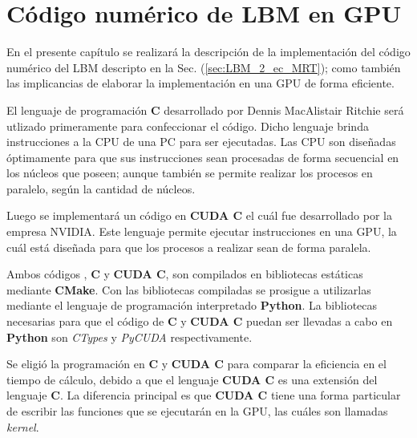 \chapter{Código numérico de LBM en GPU}
\graphicspath{{figs/cap3/}}
\label{cap3}




En el presente capítulo se realizará la descripción de la implementación del código numérico del LBM descripto en la Sec. (\ref{sec:LBM_2_ec_MRT}); como también las implicancias de elaborar la implementación en una GPU de forma eficiente.

El lenguaje de programación \textbf{C} desarrollado por Dennis MacAlistair Ritchie será utlizado primeramente para confeccionar el código. Dicho lenguaje brinda instrucciones a la CPU de una PC para ser ejecutadas. Las CPU son diseñadas óptimamente para que sus instrucciones sean procesadas de forma secuencial en los núcleos que poseen; aunque también se permite realizar los procesos en paralelo, según la cantidad de núcleos.

Luego se implementará un código en \textbf{CUDA C} el cuál fue desarrollado por la empresa NVIDIA. Este lenguaje permite ejecutar instrucciones en una GPU, la cuál está diseñada para que los procesos a realizar sean de forma paralela.

Ambos códigos , \textbf{C} y \textbf{CUDA C}, son compilados en bibliotecas estáticas mediante \textbf{CMake}. Con las bibliotecas compiladas se prosigue a utilizarlas mediante el lenguaje de programación interpretado \textbf{Python}. La bibliotecas necesarias para que el código de \textbf{C} y \textbf{CUDA C} puedan ser llevadas a cabo en \textbf{Python} son \textit{CTypes} y \textit{PyCUDA} respectivamente.

Se eligió la programación en \textbf{C} y \textbf{CUDA C} para comparar la eficiencia en el tiempo de cálculo, debido a que el lenguaje \textbf{CUDA C} es una extensión del lenguaje \textbf{C}. La diferencia principal es que \textbf{CUDA C}  tiene una forma particular de escribir las funciones que se ejecutarán en la GPU, las cuáles son llamadas \textit{kernel}.

